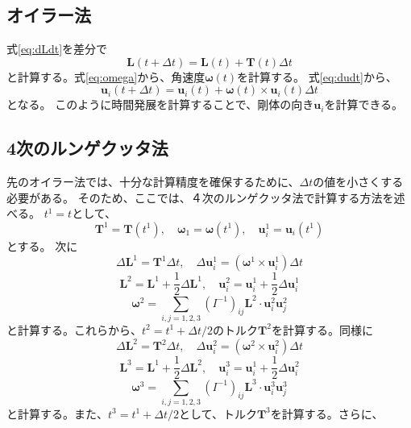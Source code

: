 \documentclass[a4paper,11pt]{jbook}
\begin{document}
\subsection{オイラー法}
式\eqref{eq:dLdt}を差分で
\begin{equation}
\bm{L}(t+\Delta t)=\bm{L}(t)+\bm{T}(t)\Delta t
\end{equation}
と計算する。式\eqref{eq:omega}から、角速度$\bm{\omega}(t)$を計算する。
式\eqref{eq:dudt}から、
\begin{equation}
\bm{u}_i(t+\Delta t)=\bm{u}_i(t)+\bm{\omega}(t)\times\bm{u}_i(t)\Delta t
\end{equation}
となる。
このように時間発展を計算することで、剛体の向き$\bm{u}_i$を計算できる。
\subsection{4次のルンゲクッタ法}
先のオイラー法では、十分な計算精度を確保するために、$\Delta t$の値を小さくする必要がある。
そのため、ここでは、４次のルンゲクッタ法で計算する方法を述べる。
$t^1=t$として、
\begin{equation}
\bm{T}^1=\bm{T}(t^1), \quad \bm{\omega}_1=\bm{\omega}(t^1),\quad \bm{u}_i^1=\bm{u}_i(t^1)
\end{equation}
とする。
次に
\begin{equation}
\Delta \bm{L}^1=\bm{T}^1\Delta t, \quad \Delta\bm{u}_i^1=(\bm{\omega}^1\times\bm{u}_i^1)\Delta t
\end{equation}
\begin{equation}
\bm{L}^2=\bm{L}^1+\frac12\Delta \bm{L}^1,\quad\bm{u}_i^2=\bm{u}_i^1+\frac12\Delta\bm{u}_i^1
\end{equation}
\begin{equation}
 \bm{\omega}^2=\sum_{i,j=1,2,3}(I^{-1})_{ij}\bm{L}^2\cdot\bm{u}_i^2\bm{u}_j^2
\end{equation}
と計算する。これらから、$t^2=t^1+\Delta t/2$のトルク$\bm{T}^2$を計算する。同様に
\begin{equation}
\Delta \bm{L}^2=\bm{T}^2\Delta t, \quad \Delta\bm{u}_i^2=(\bm{\omega}^2\times\bm{u}_i^2)\Delta t
\end{equation}
\begin{equation}
\bm{L}^3=\bm{L}^1+\frac12\Delta \bm{L}^2,\quad\bm{u}_i^3=\bm{u}_i^1+\frac12\Delta\bm{u}_i^2
\end{equation}
\begin{equation}
 \bm{\omega}^3=\sum_{i,j=1,2,3}(I^{-1})_{ij}\bm{L}^3\cdot\bm{u}_i^3\bm{u}_j^3
\end{equation}
と計算する。また、$t^3=t^1+\Delta t/2$として、トルク$\bm{T}^3$を計算する。さらに、
\end{document}
